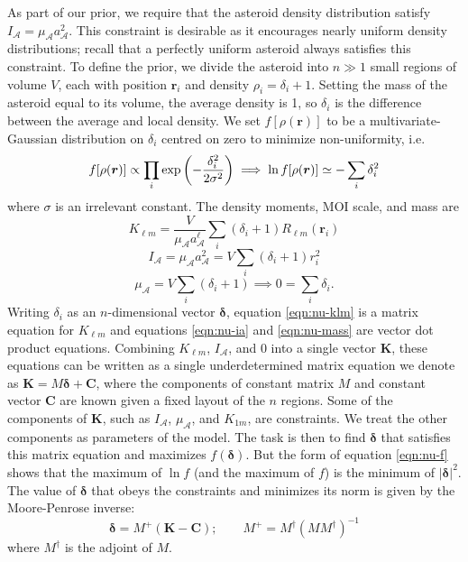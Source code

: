 As part of our prior, we require that the asteroid density distribution satisfy $I_\mathcal{A} = \mu_\mathcal{A} a_\mathcal{A}^2$. This constraint is desirable as it encourages nearly uniform density distributions; recall that a perfectly uniform asteroid always satisfies this constraint. To define the prior, we divide the asteroid into $n \gg 1$ small regions of volume $V$, each with position $\bm r_i$ and density $\rho_i = \delta_i + 1$. Setting the mass of the asteroid equal to its volume, the average density is 1, so $\delta_i$ is the difference between the average and local density. We set $f[\rho(\bm r)]$ to be a multivariate-Gaussian distribution on $\delta_i$ centred on zero to minimize non-uniformity, i.e.
\begin{equation}
  f[\rho(\bm r)] \propto \prod_i \exp\left( -\frac{\delta_i^2}{2\sigma^2} \right) \implies \ln f[\rho(\bm r)] \simeq -\sum_i \delta_i^2
  \label{eqn:nu-f}
\end{equation}
where $\sigma$ is an irrelevant constant. The density moments, MOI scale, and mass are 
\begin{equation}
  K_{\ell m} = \frac{V}{\mu_\mathcal{A}a_\mathcal{A}^{\ell}} \sum_i (\delta_i + 1) R_{\ell m}(\bm r_i)
  \label{eqn:nu-klm}
\end{equation}
\begin{equation}
  I_\mathcal{A} = \mu_\mathcal{A} a_\mathcal{A}^2 = V \sum_i (\delta_i + 1) r_i^2
  \label{eqn:nu-ia}
\end{equation}
\begin{equation}
  \mu_\mathcal{A} = V\sum_i (\delta_i + 1) \implies 0 = \sum_i \delta_i.
  \label{eqn:nu-mass}
\end{equation}
Writing $\delta_i$ as an $n$-dimensional vector $\bm \delta$, equation \ref{eqn:nu-klm} is a matrix equation for $K_{\ell m}$ and equations \ref{eqn:nu-ia} and \ref{eqn:nu-mass} are vector dot product equations. Combining $K_{\ell m}$, $I_\mathcal{A}$, and $0$ into a single vector $\bm K$, these equations can be written as a single underdetermined matrix equation we denote as $\bm K = M \bm \delta + \bm C$, where the components of constant matrix $M$ and constant vector $\bm C$ are known given a fixed layout of the $n$ regions. Some of the components of $\bm K$, such as $I_\mathcal{A}$, $\mu_\mathcal{A}$, and $K_{1m}$, are constraints. We treat the other components as parameters of the model. The task is then to find $\bm \delta$ that satisfies this matrix equation and maximizes $f(\bm \delta)$. But the form of equation \ref{eqn:nu-f} shows that the maximum of $\ln f$ (and the maximum of $f$) is the minimum of $|\bm \delta|^2$. The value of $\bm \delta$ that obeys the constraints and minimizes its norm is given by the Moore-Penrose inverse:
\begin{equation}
  \bm \delta = M^+ (\bm K - \bm C); \qquad M^+ = M^\dagger(M M^\dagger)^{-1}
  \label{eqn:nu-delta}
\end{equation}
where $M^\dagger$ is the adjoint of $M$.

